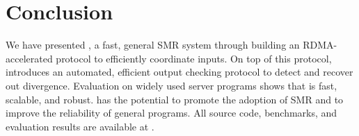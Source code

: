 \section{Conclusion}\label{sec:conclusion}

We have presented \xxx, a fast, general SMR system 
through building an RDMA-accelerated \paxos protocol to efficiently coordinate 
inputs. On top of this protocol, \xxx introduces an automated, efficient output 
checking protocol to detect and recover out divergence. Evaluation on widely 
used server programs shows that \xxx is fast, scalable, and robust. 
\xxx has the potential to promote the adoption of SMR and to improve 
the reliability of general programs. All \xxx source code, benchmarks, and 
evaluation results are available at \github.
